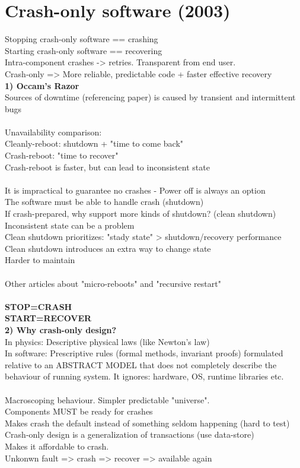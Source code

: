 \section{Crash-only software (2003)}
Stopping crash-only software == crashing \\
Starting crash-only software == recovering \\
Intra-component crashes -> retries. Transparent from end user.\\
Crash-only => More reliable, predictable code + faster effective recovery \\
\textbf{1) Occam's Razor} \\
Sources of downtime (referencing paper) is caused by transient and intermittent bugs  \\ \\
Unavailability comparison: \\
Cleanly-reboot: shutdown + "time to come back" \\
Crash-reboot: "time to recover" \\
Crash-reboot is faster, but can lead to inconsistent state \\
\\
It is impractical to guarantee no crashes - Power off is always an option \\
The software must be able to handle crash (shutdown) \\
If crash-prepared, why support more kinds of shutdown? (clean shutdown) \\
Inconsistent state can be a problem \\
Clean shutdown prioritizes: "stady state" > shutdown/recovery performance \\
Clean shutdown introduces an extra way to change state \\
Harder to maintain \\
\\
Other articles about "micro-reboots" and "recursive restart" \\
\\
\textbf{STOP=CRASH} \\
\textbf{START=RECOVER} \\

\textbf{2) Why crash-only design?} \\
In physics: Descriptive physical laws (like Newton's law) \\
In software: Prescriptive rules (formal methods, invariant proofs) formulated relative to an ABSTRACT MODEL that does not completely describe the behaviour of running system. It ignores: hardware, OS, runtime libraries etc. \\
\\
Macroscoping behaviour. Simpler predictable "universe". \\
Components MUST be ready for crashes \\
Makes crash the default instead of something seldom happening (hard to test) \\
Crash-only design is a generalization of transactions (use data-store) \\
Makes it affordable to crash. \\
Unkonwn fault => crash => recover => available again \\

